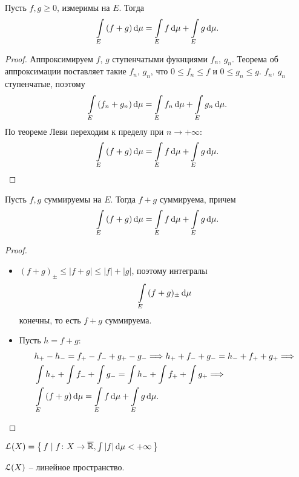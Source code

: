 \begin{theorem}

    Пусть $f, g \geqslant 0$, измеримы на $E$. Тогда
    \[
        \int\limits_E{(f + g) \,\mathrm{d}\mu} = \int\limits_E{f \,\mathrm{d}\mu} + \int\limits_E{g \,\mathrm{d}\mu}
    .\] 
\end{theorem}
\begin{proof}
    Аппроксимируем $f$, $g$ ступенчатыми фукнциями $f_n$, $g_n$.
    Теорема об аппроксимации поставляет такие $f_n$, $g_n$, что $0 \leqslant f_n \leqslant f$ и 
    $0 \leqslant g_n \leqslant g$. $f_n$, $g_n$ ступенчатые, поэтому
    \[
        \int\limits_{E}{(f_n + g_n) \,\mathrm{d}\mu} = \int\limits_{E}{f_n \,\mathrm{d}\mu} + \int\limits_{E}{g_n \,\mathrm{d}\mu}
    .\]
    По теореме Леви переходим к пределу при $n \to +\infty$:
    \[
        \int\limits_{E}{(f + g) \,\mathrm{d}\mu} = \int\limits_{E}{f \,\mathrm{d}\mu} + \int\limits_{E}{g \,\mathrm{d}\mu}
    .\]
\end{proof}

\begin{corollary}

    Пусть $f, g$ суммируемы на $E$. Тогда $f + g$ суммируема, причем
    \[
        \int\limits_E{(f + g) \,\mathrm{d}\mu} = \int\limits_E{f \,\mathrm{d}\mu} + \int\limits_E{g \,\mathrm{d}\mu}
    .\]
\end{corollary}
\begin{proof}
    \enewline
    \begin{itemize}
        \item $(f+g)_{\pm} \leqslant |f + g| \leqslant |f| + |g|$, поэтому интегралы
            \[
                \int\limits_{E}{(f + g)_{\pm} \,\mathrm{d}\mu}
            \] 
            конечны, то есть $f + g$ суммируема.
        \item Пусть $h = f + g$:
            \begin{align*}
            &h_+ - h_- = f_+ - f_- + g_+ - g_- \Longrightarrow h_+ + f_- + g_- = h_- + f_+ + g_+ \Longrightarrow \\
            &\int{h_+} + \int{f_-} + \int{g_-} = \int{h_-} + \int{f_+} + \int{g_+} \Longrightarrow \\
            &\int\limits_{E}{(f + g) \,\mathrm{d}\mu} = \int\limits_{E}{f \,\mathrm{d}\mu} + \int\limits_{E}{g \,\mathrm{d}\mu}
            .\end{align*}
    \end{itemize}
\end{proof}

\begin{definition}
    $\mathcal{L}(X) = \left\{\, f \mid f \colon X \to \overline{\mathbb{R}}, \int{|f| \,\mathrm{d}\mu} < +\infty \,\right\}$
\end{definition}

\begin{lemma}
    $\mathcal{L}(X)$ -- линейное пространство. 
\end{lemma}

